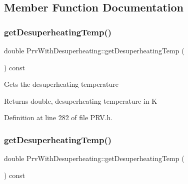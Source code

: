 \subsection{Member Function Documentation}
\mbox{\label{class_prv_with_desuperheating_af334a9ff9a14d110cb2851a76d5d84fb}} 
\subsubsection{\texorpdfstring{get\+Desuperheating\+Temp()}{getDesuperheatingTemp()}\hspace{0.1cm}{\footnotesize\ttfamily [1/3]}}
{\footnotesize\ttfamily double Prv\+With\+Desuperheating\+::get\+Desuperheating\+Temp (\begin{DoxyParamCaption}{ }\end{DoxyParamCaption}) const\hspace{0.3cm}{\ttfamily [inline]}}

Gets the desuperheating temperature

\begin{DoxyReturn}{Returns}
double, desuperheating temperature in K 
\end{DoxyReturn}


Definition at line 282 of file P\+R\+V.\+h.

\mbox{\label{class_prv_with_desuperheating_af334a9ff9a14d110cb2851a76d5d84fb}} 
\subsubsection{\texorpdfstring{get\+Desuperheating\+Temp()}{getDesuperheatingTemp()}\hspace{0.1cm}{\footnotesize\ttfamily [2/3]}}
{\footnotesize\ttfamily double Prv\+With\+Desuperheating\+::get\+Desuperheating\+Temp (\begin{DoxyParamCaption}{ }\end{DoxyParamCaption}) const\hspace{0.3cm}{\ttfamily [inline]}}

